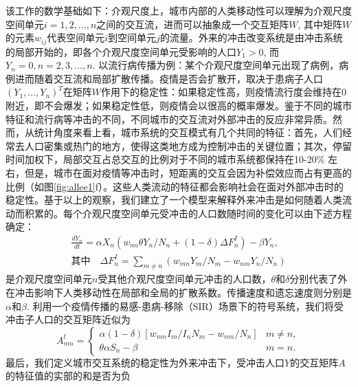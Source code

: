 该工作的数学基础如下：介观尺度上，城市内部的人类移动性可以理解为介观尺度空间单元$i = 1,2,\dots,n$之间的交互流，进而可以抽象成一个交互矩阵$W$, 其中矩阵$W$的元素$w_{i j}$代表空间单元$i$到空间单元$j$的流量。外来的冲击改变系统是由冲击系统的局部开始的，即各个介观尺度空间单元受影响的人口$Y_1>0$, 而$Y_n = 0, n = 2,3,\dots, n$. 以流行病传播为例：某个介观尺度空间单元出现了病例，病例进而随着交互流和局部扩散传播。疫情是否会扩散开，取决于患病子人口$(Y_1,\dots,Y_n)^T$在矩阵$W$作用下的稳定性：如果稳定性高，则疫情流行度会维持在$0$附近，即不会爆发；如果稳定性低，则疫情会以很高的概率爆发。鉴于不同的城市特征和流行病等冲击的不同，不同城市的交互流对外部冲击的反应非常异质。然而，从统计角度来看上看，城市系统的交互模式有几个共同的特征：首先，人们经常去人口密集或热门的地方，使得这类地方成为控制冲击的关键位置；其次，停留时间加权下，局部交互占总交互的比例对于不同的城市系统都保持在10-20\% 左右，但是，城市在面对疫情等冲击时，短距离的交互会因为补偿效应而占有更高的比例（如图\ref{fig:allee1}f）。这些人类流动的特征都会影响社会在面对外部冲击时的稳定性。基于以上的观察，我们建立了一个模型来解释外来冲击是如何随着人类流动而积累的。每个介观尺度空间单元受冲击的人口数随时间的变化可以由下述方程确定：\begin{equation}
    \begin{split}
        \frac{d Y_n}{d t} = \alpha X_n (w_{nn} \theta Y_n / N_n + (1-\delta) \Delta F_n^I) - \beta Y_n, \\
        \text{其中}\quad \Delta F_n^I = \sum_{m \ne n} (w_{mn} Y_m / N_m - w_{nm} Y_n / N_n)
    \end{split}\label{eq:allee_basic}
\end{equation}是介观尺度空间单元$n$受其他介观尺度空间单元冲击的人口数，$\theta$和$\delta$分别代表了外在冲击影响下人类移动性在局部和全局的扩散系数。传播速度和遗忘速度则分别是$\alpha$和$\beta$. 利用一个疫情传播的易感-患病-移除（SIR）场景下的符号系统，我们将受冲击子人口的交互矩阵近似为\begin{equation}
    A^t_{m n}=\begin{cases}
\alpha(1-\delta)\left[ w_{m n} I_{m} / I_{n}N_{m} - w_{n m} / N_{n}\right] & m \neq n, \\
\theta \alpha S_{n}-\beta & m=n.
\end{cases}
\end{equation}最后，我们定义城市交互系统的稳定性为外来冲击下，受冲击人口$Y$的交互矩阵$A$的特征值的实部的和是否为负

